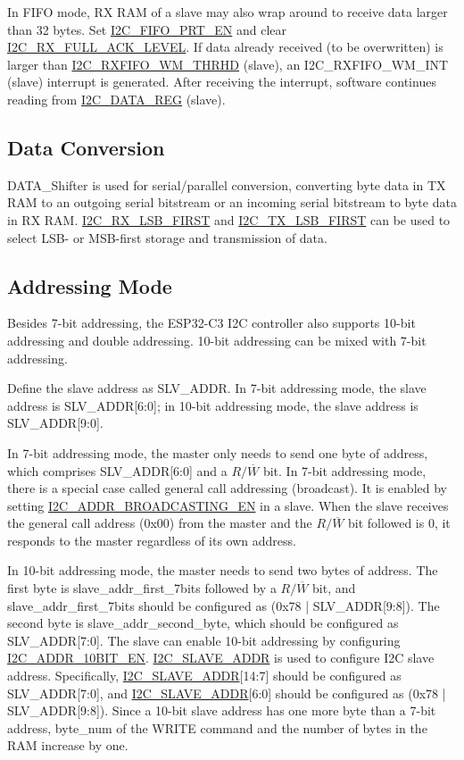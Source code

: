 \documentclass[main\_\_EN.tex]{subfiles}
\begin{document}
In FIFO mode, RX RAM of a slave may also wrap around to receive data larger than 32 bytes. Set \hyperref[fielddesc:I2CFIFOPRTEN]{I2C\_FIFO\_PRT\_EN} and clear \hyperref[fielddesc:I2CRXFULLACKLEVEL]{I2C\_RX\_FULL\_ACK\_LEVEL}. If data already received (to be overwritten) is larger than \hyperref[fielddesc:I2CRXFIFOWMTHRHD]{I2C\_RXFIFO\_WM\_THRHD} (slave), an I2C\_RXFIFO\_WM\_INT (slave) interrupt is generated. After receiving the interrupt, software continues reading from \hyperref[regdesc:I2CDATAREG]{I2C\_DATA\_REG} (slave).

\subsection{Data Conversion}
DATA\_Shifter is used for serial/parallel conversion, converting byte data in TX RAM to an outgoing serial bitstream or an incoming serial bitstream to byte data in RX RAM. \hyperref[fielddesc:I2CRXLSBFIRST]{I2C\_RX\_LSB\_FIRST} and \hyperref[fielddesc:I2CTXLSBFIRST]{I2C\_TX\_LSB\_FIRST} can be used to select LSB- or MSB-first storage and transmission of data.

\subsection{Addressing Mode}
Besides 7-bit addressing, the ESP32-C3 I2C controller also supports 10-bit addressing and double addressing. 10-bit addressing can be mixed with 7-bit addressing.

Define the slave address as SLV\_ADDR. In 7-bit addressing mode, the slave address is SLV\_ADDR[6:0]; in 10-bit addressing mode, the slave address is SLV\_ADDR[9:0].

In 7-bit addressing mode, the master only needs to send one byte of address, which comprises SLV\_ADDR[6:0] and a $R/\overline W$ bit. In 7-bit addressing mode, there is a special case called general call addressing (broadcast). It is enabled by setting \hyperref[fielddesc:I2CADDRBROADCASTINGEN]{I2C\_ADDR\_BROADCASTING\_EN} in a slave. When the slave receives the general call address (0x00) from the master and the $R/\overline W$ bit followed is 0, it responds to the master regardless of its own address.

In 10-bit addressing mode, the master needs to send two bytes of address. The first byte is slave\_addr\_first\_7bits followed by a $R/\overline W$ bit, and slave\_addr\_first\_7bits should be configured as (0x78 | SLV\_ADDR[9:8]). The second byte is slave\_addr\_second\_byte, which should be configured as SLV\_ADDR[7:0]. The slave can enable 10-bit addressing by configuring \hyperref[fielddesc:I2CADDR10BITEN]{I2C\_ADDR\_10BIT\_EN}. \hyperref[fielddesc:I2CSLAVEADDR]{I2C\_SLAVE\_ADDR} is used to configure I2C slave address. Specifically, \hyperref[fielddesc:I2CSLAVEADDR]{I2C\_SLAVE\_ADDR}[14:7] should be configured as SLV\_ADDR[7:0], and  \hyperref[fielddesc:I2CSLAVEADDR]{I2C\_SLAVE\_ADDR}[6:0] should be configured as (0x78 | SLV\_ADDR[9:8]). Since a 10-bit slave address has one more byte than a 7-bit address, byte\_num of the WRITE command and the number of bytes in the RAM increase by one.
\end{document}
